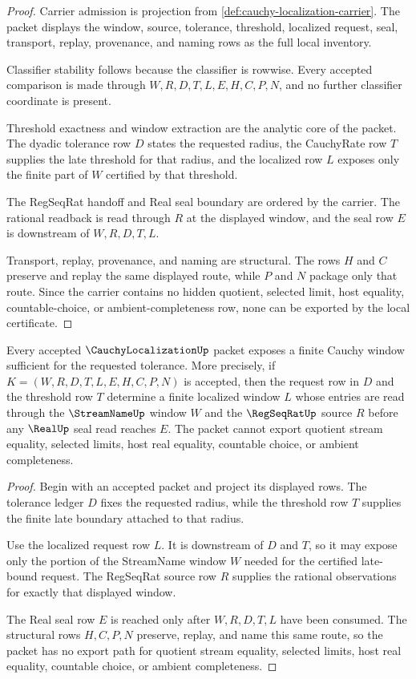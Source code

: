 \begin{proof}
Carrier admission is projection from \autoref{def:cauchy-localization-carrier}. The packet displays the window, source, tolerance, threshold, localized request, seal, transport, replay, provenance, and naming rows as the full local inventory.

Classifier stability follows because the classifier is rowwise. Every accepted comparison is made through $W,R,D,T,L,E,H,C,P,N$, and no further classifier coordinate is present.

Threshold exactness and window extraction are the analytic core of the packet. The dyadic tolerance row $D$ states the requested radius, the CauchyRate row $T$ supplies the late threshold for that radius, and the localized row $L$ exposes only the finite part of $W$ certified by that threshold.

The RegSeqRat handoff and Real seal boundary are ordered by the carrier. The rational readback is read through $R$ at the displayed window, and the seal row $E$ is downstream of $W,R,D,T,L$.

Transport, replay, provenance, and naming are structural. The rows $H$ and $C$ preserve and replay the same displayed route, while $P$ and $N$ package only that route. Since the carrier contains no hidden quotient, selected limit, host equality, countable-choice, or ambient-completeness row, none can be exported by the local certificate.
\end{proof}

\begin{theorem}
\label{thm:cauchy-localization-window-extraction}
Every accepted $\CauchyLocalizationUp$ packet exposes a finite Cauchy window sufficient for the requested tolerance. More precisely, if $K=(W,R,D,T,L,E,H,C,P,N)$ is accepted, then the request row in $D$ and the threshold row $T$ determine a finite localized window $L$ whose entries are read through the $\StreamNameUp$ window $W$ and the $\RegSeqRatUp$ source $R$ before any $\RealUp$ seal read reaches $E$. The packet cannot export quotient stream equality, selected limits, host real equality, countable choice, or ambient completeness.
\end{theorem}
\begin{proof}
Begin with an accepted packet and project its displayed rows. The tolerance ledger $D$ fixes the requested radius, while the threshold row $T$ supplies the finite late boundary attached to that radius.

Use the localized request row $L$. It is downstream of $D$ and $T$, so it may expose only the portion of the StreamName window $W$ needed for the certified late-bound request. The RegSeqRat source row $R$ supplies the rational observations for exactly that displayed window.

The Real seal row $E$ is reached only after $W,R,D,T,L$ have been consumed. The structural rows $H,C,P,N$ preserve, replay, and name this same route, so the packet has no export path for quotient stream equality, selected limits, host real equality, countable choice, or ambient completeness.
\end{proof}


